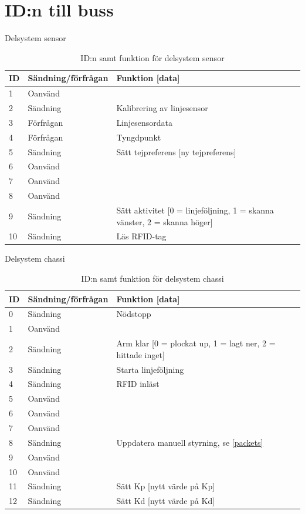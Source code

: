 \section{ID:n till buss}
\label{callbacks}

\begin{table}[H]
\centering
\label{callbacks-sensor}
Delsystem sensor
\begin{tabularx}{\textwidth}{|l|l|X|}
\hline
\textbf{ID} & \textbf{Sändning/förfrågan} & \textbf{Funktion [data]} \\ \hline
1 & Oanvänd & \\ \hline
2 & Sändning & Kalibrering av linjesensor \\ \hline
3 & Förfrågan & Linjesensordata \\ \hline
4 & Förfrågan & Tyngdpunkt \\ \hline
5 & Sändning & Sätt tejpreferens [ny tejpreferens] \\ \hline
6 & Oanvänd & \\ \hline
7 & Oanvänd & \\ \hline
8 & Oanvänd & \\ \hline
9 & Sändning & Sätt aktivitet [0 = linjeföljning, 1 = skanna vänster, 2 = skanna höger] \\ \hline
10 & Sändning & Läs RFID-tag \\ \hline
\end{tabularx}
\caption{ID:n samt funktion för delsystem sensor}
\end{table}

Delsystem chassi

\begin{table}[H]
\centering
\label{callbacks-chassi}
\begin{tabularx}{\textwidth}{|l|l|X|}
\hline
\textbf{ID} & \textbf{Sändning/förfrågan} & \textbf{Funktion [data]} \\ \hline
0 & Sändning & Nödstopp \\ \hline
1 & Oanvänd & \\ \hline
2 & Sändning & Arm klar [0 = plockat up, 1 = lagt ner, 2 = hittade inget] \\ \hline
3 & Sändning & Starta linjeföljning \\ \hline
4 & Sändning & RFID inläst \\ \hline
5 & Oanvänd & \\ \hline
6 & Oanvänd & \\ \hline
7 & Oanvänd & \\ \hline
8 & Sändning & Uppdatera manuell styrning, se \ref{packets}\\ \hline
9 & Oanvänd & \\ \hline
10 & Oanvänd & \\ \hline
11 & Sändning & Sätt Kp [nytt värde på Kp] \\ \hline
12 & Sändning & Sätt Kd [nytt värde på Kd] \\ \hline
\end{tabularx}
\caption{ID:n samt funktion för delsystem chassi}
\end{table}


